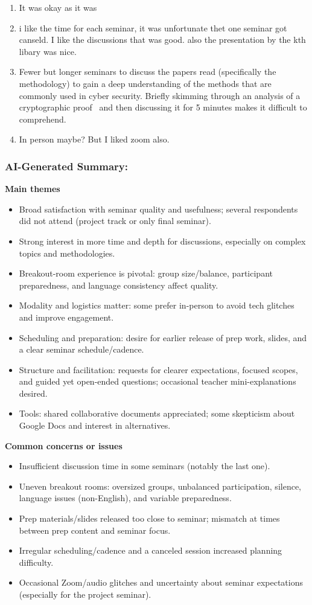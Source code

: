 \documentclass[a4paper]{report}
\begin{document}
\begin{enumerate}
  \item It was okay as it was
  \item i like the time for each seminar, it was unfortunate thet one seminar got canseld. I like the discussions that was good. also the presentation by the kth libary was nice. 
  \item Fewer but longer seminars to discuss the papers read (specifically the methodology) to gain a deep understanding of the methods that are commonly used in cyber security. Briefly skimming through an analysis of a cryptographic proof  and then discussing it for 5 minutes makes it difficult to comprehend. 
  \item In person maybe? But I liked zoom also.
\end{enumerate}

\subsubsection{AI-Generated Summary:}

\textbf{Main themes}
\begin{itemize}
\item Broad satisfaction with seminar quality and usefulness; several respondents did not attend (project track or only final seminar).
\item Strong interest in more time and depth for discussions, especially on complex topics and methodologies.
\item Breakout-room experience is pivotal: group size/balance, participant preparedness, and language consistency affect quality.
\item Modality and logistics matter: some prefer in-person to avoid tech glitches and improve engagement.
\item Scheduling and preparation: desire for earlier release of prep work, slides, and a clear seminar schedule/cadence.
\item Structure and facilitation: requests for clearer expectations, focused scopes, and guided yet open-ended questions; occasional teacher mini-explanations desired.
\item Tools: shared collaborative documents appreciated; some skepticism about Google Docs and interest in alternatives.
\end{itemize}

\textbf{Common concerns or issues}
\begin{itemize}
\item Insufficient discussion time in some seminars (notably the last one).
\item Uneven breakout rooms: oversized groups, unbalanced participation, silence, language issues (non-English), and variable preparedness.
\item Prep materials/slides released too close to seminar; mismatch at times between prep content and seminar focus.
\item Irregular scheduling/cadence and a canceled session increased planning difficulty.
\item Occasional Zoom/audio glitches and uncertainty about seminar expectations (especially for the project seminar).
\end{itemize}
\end{document}
